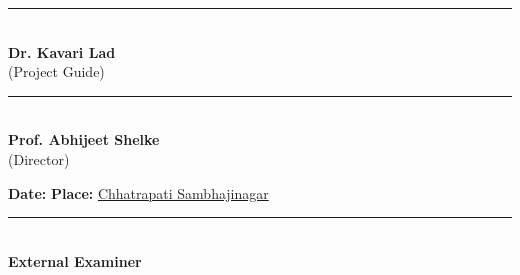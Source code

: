 {\begin{minipage}{\dimexpr\textwidth-2\fboxsep-2\fboxrule\relax}
\noindent
\begin{minipage}{0.45\textwidth}
    \centering
    \rule{4cm}{0.4pt}\\
    \textbf{Dr. Kavari Lad}\\
    (Project Guide)
\end{minipage}
\hfill
\begin{minipage}{0.45\textwidth}
    \centering
    \rule{4cm}{0.4pt}\\
    \textbf{Prof. Abhijeet Shelke}\\
    (Director)
\end{minipage}

\vspace{1.5cm}
\begin{center}
\begin{minipage}{0.9\textwidth}
\begin{center}
\textbf{Date:} \underline{\hspace{3cm}} \hspace{2cm} \textbf{Place:} \underline{Chhatrapati Sambhajinagar}
\end{center}
\end{minipage}
\end{center}

\vfill

\begin{center}
\begin{minipage}{0.45\textwidth}
    \centering
    \rule{4cm}{0.4pt}\\
    \textbf{External Examiner}
\end{minipage}
\end{center}

\vspace{0.5cm}
\end{minipage}%
}

\clearpage 